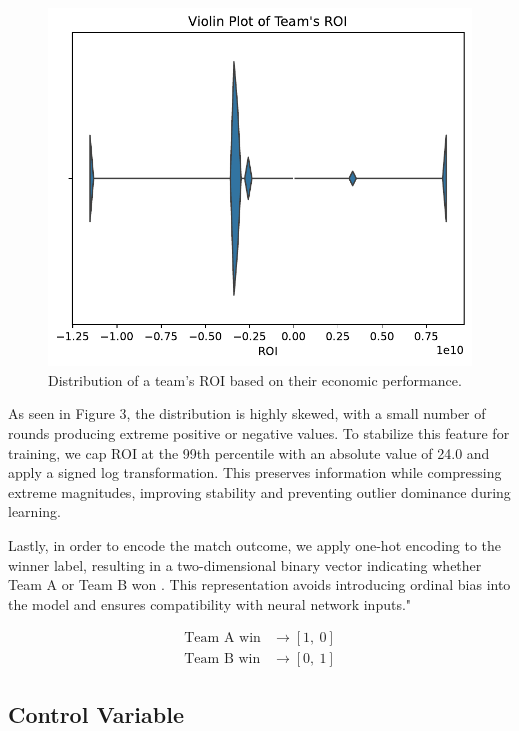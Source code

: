 \documentclass[sigconf]{acmart}
\begin{document}
\begin{figure}[ht]
  \centering
  \includegraphics[width=0.9\linewidth]{roi_violin.pdf}
  \caption{Distribution of a team's ROI based on their economic performance.}
  \label{fig:round_duration_dist}
\end{figure}

\smallskip

As seen in Figure 3, the distribution is highly skewed, with a small number of rounds producing extreme positive or negative values. To stabilize this feature for training, we cap ROI at the 99th percentile with an absolute value of 24.0 and apply a signed log transformation. This preserves information while compressing extreme magnitudes, improving stability and preventing outlier dominance during learning.

Lastly, in order to encode the match outcome, we apply one-hot encoding to the winner label, resulting in a two-dimensional binary vector indicating whether Team A or Team B won \cite{datacamp_onehot_2023}. This representation avoids introducing ordinal bias into the model and ensures compatibility with neural network inputs."

\begin{align*}
\text{Team A win} &\rightarrow [1,\ 0] \\
\text{Team B win} &\rightarrow [0,\ 1]
\end{align*}


\subsection{Control Variable}
\end{document}
